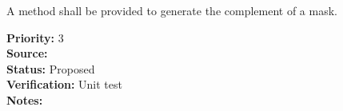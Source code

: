 A method shall be provided to generate the complement of a mask.
\begin{reqlist}
{\bf Priority:} 3 \\
{\bf Source:} \\
{\bf Status:} Proposed \\
{\bf Verification:} Unit test\\
{\bf Notes:} 
\end{reqlist}


